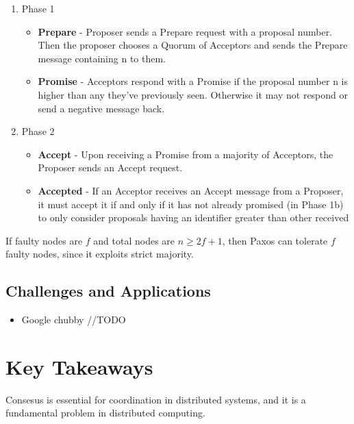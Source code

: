\begin{enumerate}
   \item Phase 1
   \begin{itemize}
      \item \textbf{Prepare} - 
      Proposer sends a Prepare request with a proposal number. Then the proposer chooses a Quorum of Acceptors and sends the Prepare message containing n to them.
      \item \textbf{Promise} - 
      Acceptors respond with a Promise if the proposal number n is higher than any they've previously seen. Otherwise it may not respond or send a negative message back.
   \end{itemize}
   \item Phase 2
   \begin{itemize}
      \item \textbf{Accept} -
      Upon receiving a Promise from a majority of Acceptors, the Proposer sends an Accept request.
      \item \textbf{Accepted} -
      If an Acceptor receives an Accept message from a Proposer, it must accept it if and only if it has not already promised (in Phase 1b) to only consider proposals having an identifier greater than other received
   \end{itemize}
\end{enumerate}

If faulty nodes are $f$ and total nodes are $n \geq 2f + 1 $, then Paxos can tolerate $f$ faulty nodes, since it exploits strict majority.

\subsection{Challenges and Applications}
   
{
   \begin{itemize}
      \item 
      Google chubby
      //TODO
   \end{itemize}
}

\section{Key Takeaways}
Consesus is essential for coordination in distributed systems, and it is a fundamental problem in distributed computing.


